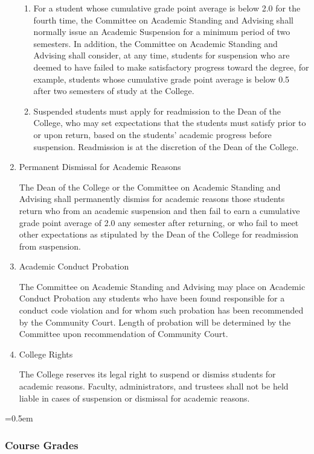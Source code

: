 \documentclass{manual}
\let\oldsubsubsection\subsubsection
\renewcommand\subsubsection{\leftskip=0.5em\oldsubsubsection}
\newcommand{\itemLevelA}{\alph*.}
\newcommand{\itemLevelB}{\arabic*)}
\newcommand{\itemRefA}{\alph*}
\newcommand{\itemRefB}{\arabic*}
\begin{document}
\begin{enumerate}[label=\itemLevelA,ref=\itemRefA]
\begin{enumerate}[label=\itemLevelB,ref=\itemRefB]
\item For a student whose cumulative grade point average is below 2.0 for the fourth time, the Committee on Academic Standing and Advising shall normally issue an Academic Suspension for a minimum period of two semesters. In addition, the Committee on Academic Standing and Advising shall consider, at any time, students for suspension who are deemed to have failed to make satisfactory progress toward the degree, for example, students whose cumulative grade point average is below 0.5 after two semesters of study at the College. 
\item Suspended students must apply for readmission to the Dean of the College, who may set expectations that the students must satisfy prior to or upon return, based on the students' academic progress before suspension. Readmission is at the discretion of the Dean of the College.
\end{enumerate}

\item Permanent Dismissal for Academic Reasons       

The Dean of the College or the Committee on Academic Standing and Advising shall permanently dismiss for academic reasons those students return who from an academic suspension and then fail to earn a cumulative grade point average of 2.0 any semester after returning, or who fail to meet other expectations as stipulated by the Dean of the College for readmission from suspension. 



\item Academic Conduct Probation

The Committee on Academic Standing and Advising may place on Academic Conduct Probation any students who have been found responsible for a conduct code violation and for whom such probation has been recommended by the Community Court. Length of probation will be determined by the Committee upon recommendation of Community Court.


\item College Rights

The College reserves its legal right to suspend or dismiss students for academic reasons. Faculty, administrators, and trustees shall not be held liable in cases of suspension or dismissal for academic reasons.
\end{enumerate}




\subsubsection{Course Grades}\label{sub:CourseGrades}
\end{document}

